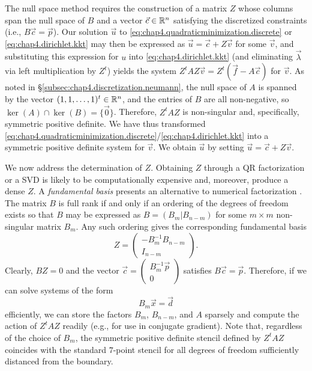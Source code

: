 The null space method requires the construction of a matrix $Z$ whose columns span the null space of $B$ and a vector $\vec{c} \in \mathbb{R}^n$ satisfying the discretized constraints (i.e., $B \vec{c} = \vec{p}$). Our solution $\vec{u}$ to \eqref{eq:chap4.quadraticminimization.discrete} or \eqref{eq:chap4.dirichlet.kkt} may then be expressed as $\vec{u} = \vec{c} + Z \vec{v}$ for some $\vec{v}$, and substituting this expression for $u$ into \eqref{eq:chap4.dirichlet.kkt} (and eliminating $\vec{\lambda}$ via left multiplication by $Z^t$) yields the system $Z^tAZ \vec{v} = Z^t (\vec{f} - A \vec{c})$ for $\vec{v}$. As noted in \S\ref{subsec:chap4.discretization.neumann}, the null space of $A$ is spanned by the vector $(1, 1, \dotsc, 1)^t \in \mathbb{R}^n$, and the entries of $B$ are all non-negative, so $\ker(A) \cap \ker(B) = \{\vec{0}\}$. Therefore, $Z^tAZ$ is non-singular and, specifically, symmetric positive definite. We have thus transformed \eqref{eq:chap4.quadraticminimization.discrete}/\eqref{eq:chap4.dirichlet.kkt} into a symmetric positive definite system for $\vec{v}$. We obtain $\vec{u}$ by setting $\vec{u} = \vec{c} + Z \vec{v}$.

We now address the determination of $Z$. Obtaining $Z$ through a QR factorization or a SVD is likely to be computationally expensive and, moreover, produce a dense $Z$. A \emph{fundamental basis} presents an alternative to numerical factorization \cite{Benzi05}. The matrix $B$ is full rank if and only if an ordering of the degrees of freedom exists so that $B$ may be expressed as $B = (B_m | B_{n-m})$ for some $m \times m$ non-singular matrix $B_m$. Any such ordering gives the corresponding fundamental basis
\begin{equation} \label{eq:chap4.fundamentalbasis}
Z = \begin{pmatrix} -B_m^{-1} B_{n-m} \\ I_{n-m} \end{pmatrix}.
\end{equation}
Clearly, $BZ = 0$ and the vector $\vec{c} = \begin{pmatrix} B_m^{-1} \vec{p} \\ 0 \end{pmatrix}$ satisfies $B \vec{c} = \vec{p}$. Therefore, if we can solve systems of the form
\begin{equation} \label{eq:chap4.bmsystem}
B_m \vec{x} = \vec{d}
\end{equation}
efficiently, we can store the factors $B_m$, $B_{n-m}$, and $A$ sparsely and compute the action of $Z^tAZ$ readily (e.g., for use in conjugate gradient). Note that, regardless of the choice of $B_m$, the symmetric positive definite stencil defined by $Z^tAZ$ coincides with the standard $7$-point stencil for all degrees of freedom sufficiently distanced from the boundary.

